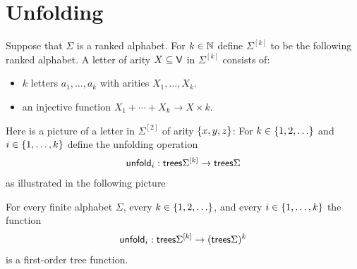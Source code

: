 \section{Unfolding}

Suppose that $\Sigma$ is a ranked alphabet. For $k \in {\mathbb N}$ define $\Sigma^{[k]}$ to be the following ranked alphabet. A letter of arity $X \subseteq \mathsf V$ in $\Sigma^{[k]}$ consists of:
\begin{itemize}
    \item $k$ letters $a_1,\ldots,a_k$ with arities $X_1,\ldots,X_k$.
    \item an injective function $X_1 + \cdots + X_k \to X \times k$.
\end{itemize}
Here is a picture of a letter in $\Sigma^{[2]}$ of arity $\{x,y,z\}$:
For $k \in \{1,2,\ldots\}$ and $i \in \{1,\ldots,k\}$ define 
 the unfolding operation 
\begin{align*}
    \mathsf{unfold}_i : \mathsf {trees} {\Sigma^{[k]}} \to \mathsf {trees} \Sigma
\end{align*}
as illustrated in the following picture
 

\begin{lemma}\label{lem:unfold}
    For every finite alphabet $\Sigma$, every $k \in \{1,2,\ldots\}$, and every $i \in \{1,\ldots,k\}$ the function
    \begin{align*}
        \mathsf{unfold}_i : \mathsf {trees} {\Sigma^{[k]}} \to (\mathsf {trees} \Sigma)^k
    \end{align*}    
     is a first-order tree function.
\end{lemma}